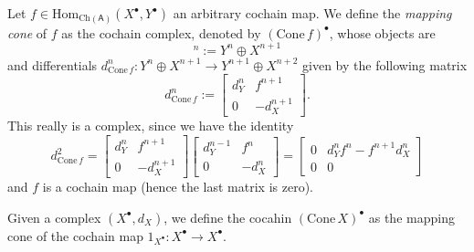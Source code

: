 \begin{defn}
	Let $f \in \mathrm{Hom}_{\mathrm{Ch}(\mathsf{A})} \left( X^\bullet, Y^\bullet \right)$ an arbitrary cochain map.
	We define the {\em mapping cone} of $f$ as the cochain complex,
	denoted by $(\mathrm{Cone}\, f)^\bullet$, whose objects are
	\begin{equation}
		[\mathrm{Cone}\, f]^n := Y^n \oplus X^{n+1}
	\end{equation} 
	and differentials $d^n_{\mathrm{Cone}\, f}: Y^n \oplus X^{n+1} \to Y^{n+1} \oplus X^{n+2}$ given by
	the following matrix
	\begin{equation}
	d^n_{\mathrm{Cone}\, f} :=
	\begin{bmatrix}
		d^n_Y & f^{n+1}\\
		0 & -d_X^{n+1}
	\end{bmatrix} 
	.\end{equation} 
	This really is a complex, since we have the identity
	\begin{equation}
	d^2_{\mathrm{Cone}\, f} =
	\begin{bmatrix}
		d^n_Y & f^{n+1}\\
		0 & -d_X^{n+1}
	\end{bmatrix} 
	\begin{bmatrix}
		d^{n-1}_Y & f^{n}\\
		0 & -d_X^{n}
	\end{bmatrix}  = 
	\begin{bmatrix}
		0 & d^n_Y f^n - f^{n+1} d^n_X\\
		0 & 0
	\end{bmatrix} 
	\end{equation} 
	and $f$ is a cochain map (hence the last matrix is zero).
\end{defn}

\begin{defn}
	Given a complex $\left( X^{\bullet}, d_{X} \right)$, we define the cocahin $(\mathrm{Cone}\, X)^\bullet$ as the
	mapping cone of the cochain map $1_{X^\bullet}: X^\bullet \to X^\bullet$.
\end{defn}


